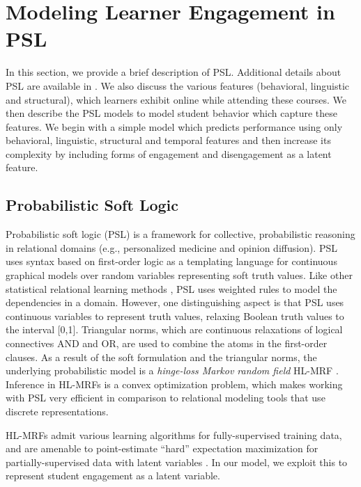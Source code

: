 
\section{Modeling Learner Engagement in PSL}
\label{others}

In this section, we  provide a brief description of PSL. Additional details about PSL are available in \cite{psl}. We also discuss the various features (behavioral, linguistic and structural), which learners exhibit online while attending these courses. We then describe the PSL models to model student behavior which capture these features. We begin with a simple model which predicts performance using only behavioral, linguistic, structural and temporal features and then increase its complexity by including forms of engagement and disengagement as a latent feature.

\subsection{Probabilistic Soft Logic}
\label{sec:psl}

Probabilistic soft logic (PSL) \cite{psl} is a framework for collective, probabilistic reasoning
in relational domains (e.g., personalized medicine and opinion diffusion). PSL uses syntax based on first-order logic as a templating language for continuous graphical models over random variables representing soft truth values.
Like other statistical relational learning methods \cite{srl-book}, PSL uses weighted rules to model the dependencies in a domain. However, one distinguishing aspect is that PSL uses continuous variables to represent truth values, relaxing Boolean truth values to the interval [0,1]. Triangular norms, which are continuous relaxations of logical connectives AND
and OR, are used to combine the atoms in the first-order clauses. 
As a result of the soft formulation and the triangular norms, the underlying probabilistic model is a \emph{hinge-loss Markov random field} HL-MRF \cite{bach-uai13}.  
Inference in HL-MRFs is a convex optimization problem, which makes working with PSL very efficient in comparison to relational modeling tools that use discrete representations.

HL-MRFs admit various learning algorithms for fully-supervised training data, and are amenable to point-estimate ``hard'' expectation maximization for partially-supervised data with latent variables \cite{bach-inferning13}. In our model, we exploit this to represent student engagement as a latent variable.

